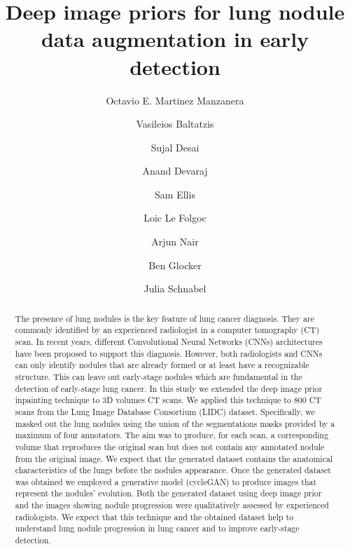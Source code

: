 \documentclass[runningheads]{llncs}
\begin{document}
%
\title{Deep image priors for lung nodule data augmentation in early detection}
%
%
\author{Octavio E. Martinez Manzanera \and
Vasileios Baltatzis \and
Sujal Desai \and
Anand Devaraj \and
Sam Ellis \and
Loic Le Folgoc \and
Arjun Nair \and
Ben Glocker \and
Julia Schnabel}
%
%
%
\maketitle              %
%
\begin{abstract}
The presence of lung nodules is the key feature of lung cancer diagnosis. They are commonly identified  by an experienced radiologist in a computer tomography (CT) scan. In recent years, different Convolutional Neural Networks (CNNs) architectures have been proposed to support this diagnosis. However, both radiologists and CNNs can only identify nodules that are already formed or at least have a recognizable structure. This can leave out early-stage nodules which are fundamental in the detection of early-stage lung cancer. In this study we extended the deep image prior inpainting technique to 3D volumes CT scans. We applied this technique to 800 CT scans from the Lung Image Database Consortium (LIDC) dataset. Specifically, we masked out the lung nodules using the union of the segmentations masks provided by a maximum of four annotators. The aim was to produce, for each scan, a corresponding volume that reproduces the original scan but does not contain any annotated nodule from the original image. We expect that the generated dataset contains the anatomical characteristics of the lungs before the nodules appearance. Once the generated dataset was obtained we employed a generative model (cycleGAN) to produce images that represent the nodules' evolution. Both the generated dataset using deep image prior and the images showing nodule progression were qualitatively assessed by experienced radiologists. We expect that this technique and the obtained dataset help to understand lung nodule progression in lung cancer and to improve early-stage detection.

\end{abstract}
%
%
\end{document}
